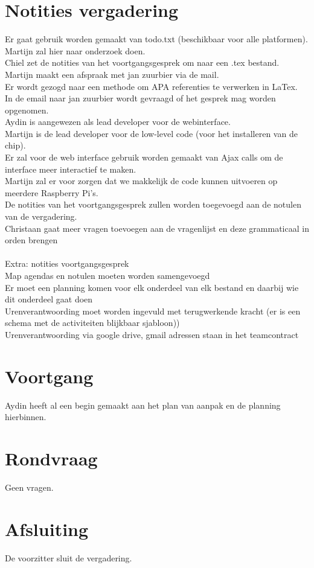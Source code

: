 \documentclass[dutch]{hu}
\begin{document}
\section{Notities vergadering}
Er gaat gebruik worden gemaakt van todo.txt (beschikbaar voor alle platformen). Martijn zal hier naar onderzoek doen. \\

Chiel zet de notities van het voortgangsgesprek om naar een .tex bestand. \\

Martijn maakt een afspraak met jan zuurbier via de mail. \\

Er wordt gezogd naar een methode om APA referenties te verwerken in LaTex. \\

In de email naar jan zuurbier wordt gevraagd of het gesprek mag worden opgenomen. \\

Aydin is aangewezen als lead developer voor de webinterface. \\

Martijn is de lead developer voor de low-level code (voor het installeren van de chip). \\

Er zal voor de web interface gebruik worden gemaakt van Ajax calls om de interface meer interactief te maken. \\

Martijn zal er voor zorgen dat we makkelijk de code kunnen uitvoeren op meerdere Raspberry Pi's. \\

De notities van het voortgangsgesprek zullen worden toegevoegd aan de notulen van de vergadering. \\

Christaan gaat meer vragen toevoegen aan de vragenlijst en deze grammaticaal in orden brengen \\ \\

Extra: notities voortgangsgesprek \\
Map agendas en notulen moeten worden samengevoegd \\
Er moet een planning komen voor elk onderdeel van elk bestand en daarbij wie dit onderdeel gaat doen \\
Urenverantwoording moet worden ingevuld met terugwerkende kracht (er is een schema met de activiteiten blijkbaar sjabloon)) \\
Urenverantwoording via google drive, gmail adressen staan in het teamcontract \\

\newpage
\section{Voortgang}
Aydin heeft al een begin gemaakt aan het plan van aanpak en de planning hierbinnen.

\section{Rondvraag}
Geen vragen.

\section{Afsluiting}
De voorzitter sluit de vergadering.
\end{document}
